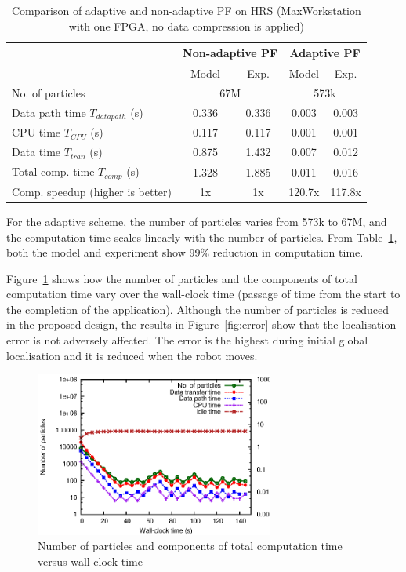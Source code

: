 \begin{table}[h]
	\setlength{\tabcolsep}{5pt}
	\begin{spacing}{1.0}
	\caption{Comparison of adaptive and non-adaptive PF on HRS (MaxWorkstation with one FPGA, no data compression is applied)\label{tab:pf}}{
	\centering
	\smallskip
		\begin{tabular}{| l || c c | c c |}
			\hline
			 \multirow{2}{*}{}  & \multicolumn{2}{|c|}{Non-adaptive PF} & \multicolumn{2}{|c|}{Adaptive PF} \\
			\hline
			  & Model & Exp. & Model & Exp. \\
			\hline
			\hline
			 No. of particles & \multicolumn{2}{|c|}{67M} & \multicolumn{2}{|c|}{573k} \\
			\hline
			 Data path time $T_{datapath}$ (s) 		& 0.336 & 0.336 & 0.003 & 0.003 \\
			 CPU time $T_{CPU}$ (s) 				& 0.117 & 0.117 & 0.001 & 0.001 \\
			 Data time $T_{tran}$ (s) 				& 0.875 & 1.432 & 0.007 & 0.012 \\
			 Total comp. time $T_{comp}$ (s)			& 1.328 & 1.885 & 0.011	& 0.016 \\
			\hline
			 Comp. speedup (higher is better)		& 1x	& 1x	& 120.7x	& 117.8x \\
			\hline
		\end{tabular}
	}
	\end{spacing}
\end{table}

For the adaptive scheme, the number of particles varies from 573k to 67M, and the computation time scales linearly with the number of particles.
From Table~\ref{tab:pf}, both the model and experiment show 99\% reduction in computation time.

Figure~\ref{fig:adaptive} shows how the number of particles and the components of total computation time vary over the wall-clock time (passage of time from the start to the completion of the application).
Although the number of particles is reduced in the proposed design, the results in Figure~\ref{fig:error} show that the localisation error is not adversely affected.
The error is the highest during initial global localisation and it is reduced when the robot moves.

\begin{figure}[t!]
\centering
\includegraphics[width=0.7\textwidth]{runtime_reconfiguration/figures/fig_adaptive}
\caption{Number of particles and components of total computation time versus wall-clock time}
\label{fig:adaptive}
\end{figure}


